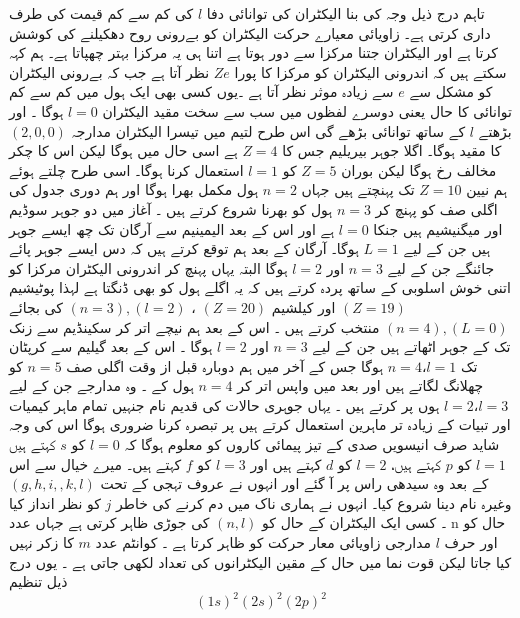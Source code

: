 
تاہم درج ذیل وجہ کی بنا الیکٹران کی توانائی دفا
 \(l\) 
کی کم سے کم قیمت کی طرف داری کرتی ہے۔ زاویائی معیارے حرکت الیکٹران کو بےرونی روح دھکیلنے کی کوشش کرتا ہے اور الیکٹران جتنا مرکزا سے دور ہوتا ہے اتنا ہی یہ مرکزا بہتر چھپاتا ہے۔ ہم کہہ سکتے ہیں کہ اندرونی الیکٹران کو مرکزا کا پورا 
\(Ze\)
نظر آتا ہے جب کہ بےرونی الیکٹران کو مشکل سے 
\(e\)
 سے زیادہ موثر  نظر آتا ہے ۔یوں کسی بھی ایک ہول میں کم سے کم توانائی کا حال یعنی دوسرے لفظوں میں سب سے سخت مقید الیکٹران
 \( l=0\) 
 ہوگا ۔ اور بڑھتے
  \(l\) 
 کے ساتھ توانائی بڑھے گی اس طرح لتیم میں تیسرا الیکٹران مدارجہ
  \((2,0,0)\)
 کا مقید ہوگا۔ اگلا جوہر بیریلیم جس کا
  \(Z=4\) 
 ہے اسی حال میں ہوگا لیکن اس کا چکر مخالف رخ ہوگا لیکن بوران
  \(Z=5\) 
 کو
 \( l=1\) 
 استعمال کرنا ہوگا۔ اسی طرح چلتے ہوئے ہم  نیین
 \( Z=10\) 
 تک پہنچتے ہیں جہاں
  \(n=2\) 
 ہول مکمل بھرا ہوگا اور ہم دوری جدول کی اگلی صف کو پہنچ کر
  \(n= 3\) 
 ہول کو بھرنا شروع کرتے ہیں ۔ آغاز میں دو جوہر سوڈیم اور میگنیشیم ہیں جنکا
 \( l=0\) 
 ہے اور اس کے بعد الیمینیم سے آرگان تک چھ ایسے جوہر ہیں جن کے لیے 
 \(L=1\)
  ہوگا۔ آرگان کے بعد ہم توقع کرتے ہیں کہ دس ایسے جوہر پائے جائنگے جن کے لیے 
  \(n=3\) 
  اور 
  \(l=2\) 
  ہوگا البتہ یہاں پہنچ کر اندرونی الیکٹران مرکزا کو اتنی خوش اسلوبی کے ساتھ پردہ کرتے ہیں کہ یہ اگلے ہول کو بھی ڈنگتا ہے لہذا پوٹیشیم
\(( Z=19)\) 
  اور کیلشیم
  \((Z=20)\)
  ،
  \((n=3),(l=2)\)
 کی بجائے
 \( (n=4),( L=0 )\)
 منتخب کرتے ہیں  ۔ اس کے بعد ہم نیچے اتر کر سکینڈیم سے زنک تک کے جوہر اٹھاتے ہیں جن کے لیے
 \( n=3\)
  اور
\( l=2\)
   ہوگا ۔ اس کے بعد گیلیم سے کرپٹان تک
\( n=4، l=1\)
    ہوگا جس کے آخر میں ہم دوبارہ قبل از وقت اگلی صف
\( n=5\) 
    کو چھلانگ لگاتے ہیں اور بعد میں واپس اتر کر
\( n= 4\)  
    ہول کے ۔ وہ مدارجے جن کے لیے
\( l=2، l=3\) 
    ہوں پر کرتے ہیں ۔ یہاں جوہری حالات کی قدیم نام جنہیں تمام ماہر کیمیات اور تبیات کے زیادہ تر ماہرین استعمال کرتے ہیں پر تبصرہ کرنا ضروری ہوگا اس کی وجہ شاید صرف انیسویں صدی کے تیز پیمائی کاروں کو معلوم ہوگا کہ
 \(l=0\) 
    کو
  \(s\)
      کہتے ہیں 
 \(l=1\)
       کو 
 \(p\)
        کہتے ہیں،
\( l=2\) 
        کو
   \(d\)
          کہتے ہیں اور
   \(l=3\)
            کو
\( f\)
  کہتے ہیں۔ میرے خیال سے اس کے بعد وہ سیدھی راس پر آ گئے اور انہوں نے عروف تہجی کے تحت
\( (g,h,i,,k,l)\)
   وغیرہ نام دینا شروع کیا۔ انہوں نے ہماری ناک میں دم کرنے کی خاطر 
  \(j\)
    کو نظر انداز کیا ۔ کسی ایک الیکٹران کے حال کو
    \( (n,l)\) 
    کی جوڑی ظاہر کرتی ہے جہاں عدد n حال کو اور حرف
    \(l\)
      مدارجی زاویائی معار حرکت کو ظاہر کرتا ہے ۔ کوانٹم عدد
   \(m\) 
      کا زکر نہیں کیا جاتا لیکن قوت نما میں حال کے مقین الیکٹرانوں کی تعداد لکھی جاتی ہے ۔ یوں درج ذیل تنظیم 
\[(1s)^{2}(2s)^{2}(2p)^{2} \]
